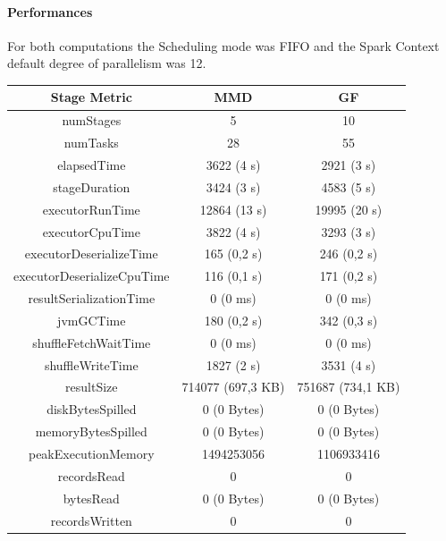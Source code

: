 \documentclass[a4paper,11pt, twoside]{article}
\begin{document}
            \paragraph{Performances}
            For both computations the Scheduling mode was FIFO and the Spark Context default degree of parallelism was 12.
            \begin{table}[h!]
                    \centering
            	\small
            	\begin{tabular}{ccc}
            		\toprule
            		  \textbf{Stage Metric} & \textbf{MMD} & \textbf{GF} \\
            		\midrule
            		numStages & 5 & 10 \\
                        numTasks & 28 & 55 \\
                        elapsedTime & 3622 (4 s) & 2921 (3 s) \\
                        stageDuration & 3424 (3 s) & 4583 (5 s) \\
                        executorRunTime & 12864 (13 s) & 19995 (20 s) \\
                        executorCpuTime & 3822 (4 s) & 3293 (3 s) \\
                        executorDeserializeTime & 165 (0,2 s) & 246 (0,2 s) \\
                        executorDeserializeCpuTime & 116 (0,1 s) & 171 (0,2 s) \\
                        resultSerializationTime & 0 (0 ms) & 0 (0 ms) \\
                        jvmGCTime & 180 (0,2 s) & 342 (0,3 s) \\
                        shuffleFetchWaitTime & 0 (0 ms) & 0 (0 ms) \\
                        shuffleWriteTime & 1827 (2 s) & 3531 (4 s) \\
                        resultSize & 714077 (697,3 KB) & 751687 (734,1 KB) \\
                        diskBytesSpilled & 0 (0 Bytes) & 0 (0 Bytes) \\
                        memoryBytesSpilled & 0 (0 Bytes) & 0 (0 Bytes) \\
                        peakExecutionMemory & 1494253056 & 1106933416 \\
                        recordsRead & 0 & 0 \\
                        bytesRead & 0 (0 Bytes) & 0 (0 Bytes) \\
                        recordsWritten & 0 & 0 \\

\end{tabular}
\end{table}
\end{document}
